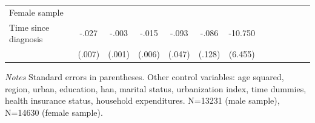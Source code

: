 \begin{table}[h]
\begin{adjustbox}{max width=\linewidth}
\begin{threeparttable}
{\begin{tabular}{l*{6}{S
S}}
Female sample &&&&&&\\
Time since diagnosis&    -.027\sym{***}&    -.003\sym{*}  &    -.015\sym{***}&    -.093\sym{**} &    -.086         &  -10.750\sym{*}  \\
                &   (.007)         &   (.001)         &   (.006)         &   (.047)         &   (.128)         &  (6.455)         \\          
\bottomrule
\end{tabular}
\begin{tablenotes}
\item \textit{Notes}   Standard errors in parentheses.
Other control variables: age squared, region, urban, education, han, marital status, urbanization index, time dummies, health insurance status, household expenditures. N=13231 (male sample), N=14630 (female sample).
\end{tablenotes}
}
\end{threeparttable}
\end{adjustbox}
\end{table}



